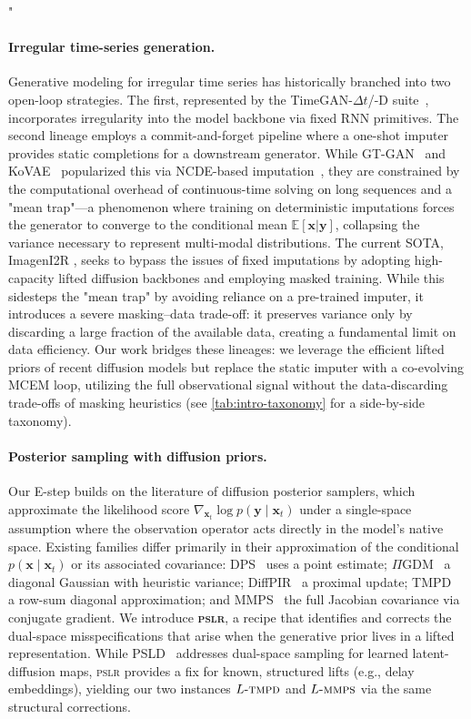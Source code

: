 "\documentclass{article}
\theoremstyle{plain}
\theoremstyle{definition}
\theoremstyle{remark}
\newcommand{\pslr}{\textsc{pslr}}
\newcommand{\lmmps}{L\mbox{-}\textsc{mmps}}
\newcommand{\ltmpd}{L\mbox{-}\textsc{tmpd}}
\begin{document}
\paragraph{Irregular time-series generation.}
Generative modeling for irregular time series has historically branched into two open-loop strategies. The first, represented by the TimeGAN-$\Delta t$/-D suite~\citep{jeon2022gtgan,che2018recurrent}, incorporates irregularity into the model backbone via fixed RNN primitives. The second lineage employs a commit-and-forget pipeline where a one-shot imputer provides static completions for a downstream generator. While GT-GAN~\citep{jeon2022gtgan} and KoVAE~\citep{naiman2024kovae} popularized this via NCDE-based imputation~\citep{kidger2020ncde}, they are constrained by the computational overhead of continuous-time solving on long sequences and a "mean trap"—a phenomenon where training on deterministic imputations forces the generator to converge to the conditional mean $\mathbb{E}[\mathbf{x}|\mathbf{y}]$, collapsing the variance necessary to represent multi-modal distributions. The current SOTA, ImagenI2R \citep{fadlon2025imageni2r}, seeks to bypass the issues of fixed imputations by adopting high-capacity lifted diffusion backbones and employing masked training. While this sidesteps the "mean trap" by avoiding reliance on a pre-trained imputer, it introduces a severe masking–data trade-off: it preserves variance only by discarding a large fraction of the available data, creating a fundamental limit on data efficiency. Our work bridges these lineages: we leverage the efficient lifted priors of recent diffusion models but replace the static imputer with a co-evolving MCEM loop, utilizing the full observational signal without the data-discarding trade-offs of masking heuristics (see \cref{tab:intro-taxonomy} for a side-by-side taxonomy).

\paragraph{Posterior sampling with diffusion priors.}
Our E-step builds on the literature of diffusion posterior samplers, which approximate the likelihood score $\nabla_{\mathbf{x}_t} \log p(\mathbf{y}\mid \mathbf{x}_t)$ under a single-space assumption where the observation operator acts directly in the model's native space. Existing families differ primarily in their approximation of the conditional $p(\mathbf{x}\mid \mathbf{x}_t)$ or its associated covariance: DPS~\citep{chung2023dps} uses a point estimate; $\Pi$GDM~\citep{song2023pigdm} a diagonal Gaussian with heuristic variance; DiffPIR~\citep{zhu2023diffpir} a proximal update; TMPD~\citep{boys2023tmpd} a row-sum diagonal approximation; and MMPS~\citep{rozet2024diem} the full Jacobian covariance via conjugate gradient. We introduce \textbf{\pslr{}}, a recipe that identifies and corrects the dual-space misspecifications that arise when the generative prior lives in a lifted representation. While PSLD~\citep{rout2024psld} addresses dual-space sampling for learned latent-diffusion maps, \pslr{} provides a fix for known, structured lifts (e.g., delay embeddings), yielding our two instances $\ltmpd$ and $\lmmps$ via the same structural corrections.
\end{document}
